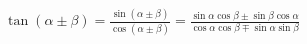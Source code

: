 \documentclass[preview]{standalone}
\begin{document}
\begin{align*}
\tan(\alpha \pm \beta) = \frac{\sin(\alpha\pm\beta)}{\cos(\alpha\pm\beta)} = \frac{\sin\alpha\cos\beta\pm\sin\beta\cos\alpha}{\cos\alpha\cos\beta\mp\sin\alpha\sin\beta}
\end{align*}
\end{document}
